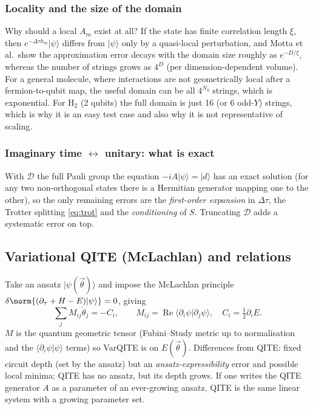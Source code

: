 \documentclass[11pt,a4paper]{article}
\newcommand{\ket}[1]{\lvert #1\rangle}
\begin{document}
\subsubsection*{Locality and the size of the domain}
Why should a local $A_m$ exist at all? If the state has finite correlation length $\xi$, then
$e^{-\Delta\tau h_m}\ket\psi$ differs from $\ket\psi$ only by a quasi-local perturbation, and
Motta et al.\ show the approximation error decays with the domain size roughly as $e^{-D/\xi}$,
whereas the number of strings grows as $4^{D}$ (per dimension-dependent volume). For a general
molecule, where interactions are not geometrically local after a fermion-to-qubit map, the useful
domain can be \alert{all} $4^{N_q}$ strings, which is exponential. For $\mathrm{H}_2$ (2 qubits) the full
domain is just 16 (or 6 odd-$Y$) strings, which is why it is an easy test case and also why it is
\alert{not} representative of scaling.

\subsubsection*{Imaginary time $\leftrightarrow$ unitary: what is exact}
With $\mathcal D$ the full Pauli group the equation $-iA\ket\psi=\ket d$ has an exact solution
(for any two non-orthogonal states there is a Hermitian generator mapping one to the other), so the
only remaining errors are the \emph{first-order expansion} in $\Delta\tau$, the Trotter splitting
\cref{eq:trot} and the \emph{conditioning} of $S$. Truncating $\mathcal D$ adds a systematic
error on top.

\subsection{Variational QITE (McLachlan) and relations}\label{sec:var}
Take an ansatz $\ket{\psi(\vec\theta)}$ and impose the McLachlan principle
$\delta\norm{(\partial_\tau+H-E)\ket\psi}=0$, giving
\begin{equation}
  \sum_j M_{ij}\dot\theta_j=-C_i,\qquad
  M_{ij}=\operatorname{Re}\langle\partial_i\psi\vert\partial_j\psi\rangle,\quad
  C_i=\tfrac12\partial_i E .
\end{equation}
$M$ is the quantum geometric tensor (Fubini--Study metric up to normalisation and the
$\langle\partial_i\psi\vert\psi\rangle$ terms) so VarQITE is  on $E(\vec\theta)$. Differences from
QITE: fixed circuit depth (set by the ansatz) but an \emph{ansatz-expressibility} error and
possible local minima; QITE has no ansatz, but its depth grows. If one writes the QITE
generator $A$ as a parameter of an ever-growing ansatz, QITE is the same linear system with a
growing parameter set.
\end{document}
